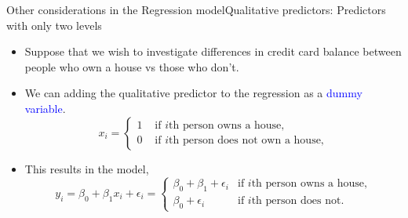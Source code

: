 \begin{frame}{Other considerations in the Regression model}{Qualitative predictors: Predictors with only two levels}

\begin{itemize}
    \item Suppose that we wish to investigate differences in credit card balance between people who own a house vs those who don't. \pause
    \item We can adding the qualitative predictor to the regression as a \textcolor{blue}{dummy variable}. \pause 
        \begin{equation*}
        x_i = 
        \begin{cases} 
            1 & \text{ if $i$th person owns a house,}\\
            0 & \text{ if $i$th person does not own a house,}
        \end{cases}
    \end{equation*}

    \item This results in the model,
    \begin{equation*}
        y_i = \beta_0 + \beta_1 x_i + \epsilon_i = 
        \begin{cases}
              \beta_0 + \beta_1 + \epsilon_i & \text{if $i$th person owns a house,} \\
                 \beta_0 + \epsilon_i & \text{if $i$th person does not.}
        \end{cases}
    \end{equation*}
\end{itemize}

\end{frame}

